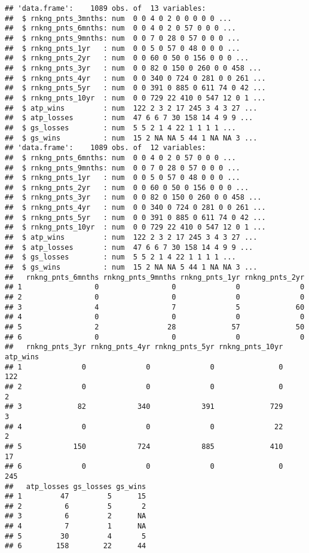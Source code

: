 \documentclass[]{article}
\begin{document}
\begin{verbatim}
## 'data.frame':    1089 obs. of  13 variables:
##  $ rnkng_pnts_3mnths: num  0 0 4 0 2 0 0 0 0 0 ...
##  $ rnkng_pnts_6mnths: num  0 0 4 0 2 0 57 0 0 0 ...
##  $ rnkng_pnts_9mnths: num  0 0 7 0 28 0 57 0 0 0 ...
##  $ rnkng_pnts_1yr   : num  0 0 5 0 57 0 48 0 0 0 ...
##  $ rnkng_pnts_2yr   : num  0 0 60 0 50 0 156 0 0 0 ...
##  $ rnkng_pnts_3yr   : num  0 0 82 0 150 0 260 0 0 458 ...
##  $ rnkng_pnts_4yr   : num  0 0 340 0 724 0 281 0 0 261 ...
##  $ rnkng_pnts_5yr   : num  0 0 391 0 885 0 611 74 0 42 ...
##  $ rnkng_pnts_10yr  : num  0 0 729 22 410 0 547 12 0 1 ...
##  $ atp_wins         : num  122 2 3 2 17 245 3 4 3 27 ...
##  $ atp_losses       : num  47 6 6 7 30 158 14 4 9 9 ...
##  $ gs_losses        : num  5 5 2 1 4 22 1 1 1 1 ...
##  $ gs_wins          : num  15 2 NA NA 5 44 1 NA NA 3 ...
## 'data.frame':    1089 obs. of  12 variables:
##  $ rnkng_pnts_6mnths: num  0 0 4 0 2 0 57 0 0 0 ...
##  $ rnkng_pnts_9mnths: num  0 0 7 0 28 0 57 0 0 0 ...
##  $ rnkng_pnts_1yr   : num  0 0 5 0 57 0 48 0 0 0 ...
##  $ rnkng_pnts_2yr   : num  0 0 60 0 50 0 156 0 0 0 ...
##  $ rnkng_pnts_3yr   : num  0 0 82 0 150 0 260 0 0 458 ...
##  $ rnkng_pnts_4yr   : num  0 0 340 0 724 0 281 0 0 261 ...
##  $ rnkng_pnts_5yr   : num  0 0 391 0 885 0 611 74 0 42 ...
##  $ rnkng_pnts_10yr  : num  0 0 729 22 410 0 547 12 0 1 ...
##  $ atp_wins         : num  122 2 3 2 17 245 3 4 3 27 ...
##  $ atp_losses       : num  47 6 6 7 30 158 14 4 9 9 ...
##  $ gs_losses        : num  5 5 2 1 4 22 1 1 1 1 ...
##  $ gs_wins          : num  15 2 NA NA 5 44 1 NA NA 3 ...
##   rnkng_pnts_6mnths rnkng_pnts_9mnths rnkng_pnts_1yr rnkng_pnts_2yr
## 1                 0                 0              0              0
## 2                 0                 0              0              0
## 3                 4                 7              5             60
## 4                 0                 0              0              0
## 5                 2                28             57             50
## 6                 0                 0              0              0
##   rnkng_pnts_3yr rnkng_pnts_4yr rnkng_pnts_5yr rnkng_pnts_10yr atp_wins
## 1              0              0              0               0      122
## 2              0              0              0               0        2
## 3             82            340            391             729        3
## 4              0              0              0              22        2
## 5            150            724            885             410       17
## 6              0              0              0               0      245
##   atp_losses gs_losses gs_wins
## 1         47         5      15
## 2          6         5       2
## 3          6         2      NA
## 4          7         1      NA
## 5         30         4       5
## 6        158        22      44
\end{verbatim}
\end{document}
